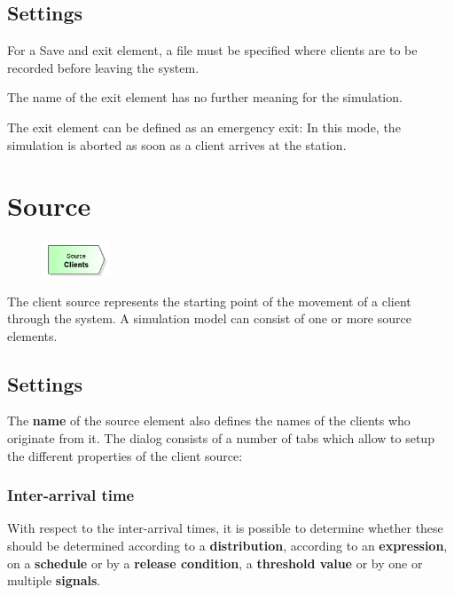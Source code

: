 \subsection*{Settings}

For a Save and exit element, a file must be specified where clients are to be recorded before leaving the system.

The name of the exit element has no further meaning for the simulation.

The exit element can be defined as an emergency exit: In this mode, the simulation is aborted
as soon as a client arrives at the station.


\section{Source}
\label{ref:ModelElementSource}

\begin{figure}
\vspace{-22pt}
\includegraphics[width=2cm]{imageModelElementSource.png}
\vspace{-22pt}
\end{figure}

The client source represents the starting point of the movement of a client through the system.
A simulation model can consist of one or more source elements.

\subsection*{Settings}

The \textbf{name} of the source element also defines the names of the clients who originate from it.
The dialog consists of a number of tabs which allow to setup the different properties of the client source:

\subsubsection*{Inter-arrival time}

With respect to the inter-arrival times, it is possible to determine whether these
should be determined according to a \textbf{distribution}, according to an \textbf{expression},
on a \textbf{schedule} or by a \textbf{release condition}, a \textbf{threshold value} or by
one or multiple \textbf{signals}.

